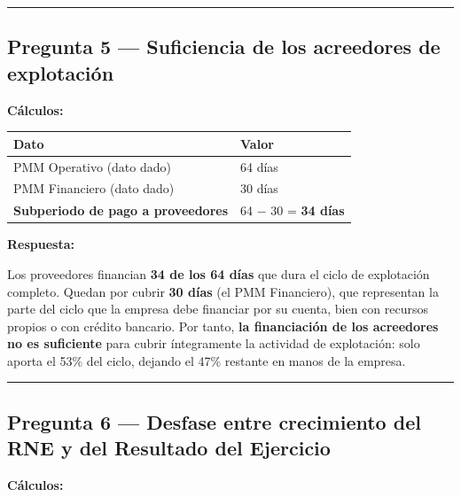 \documentclass[12pt]{book} %
\begin{document}
\begin{center}\rule{0.5\linewidth}{0.5pt}\end{center}

\hypertarget{pregunta-5-suficiencia-de-los-acreedores-de-explotaciuxf3n}{%
\subsection{Pregunta 5 --- Suficiencia de los acreedores de
explotación}\label{pregunta-5-suficiencia-de-los-acreedores-de-explotaciuxf3n}}

\textbf{Cálculos:}

\begin{longtable}[]{@{}ll@{}}
\toprule\noalign{}
Dato & Valor \\
\midrule\noalign{}
\endhead
\bottomrule\noalign{}
\endlastfoot
PMM Operativo (dato dado) & 64 días \\
PMM Financiero (dato dado) & 30 días \\
\textbf{Subperiodo de pago a proveedores} & 64 − 30 = \textbf{34
días} \\
\end{longtable}

\textbf{Respuesta:}

Los proveedores financian \textbf{34 de los 64 días} que dura el ciclo
de explotación completo. Quedan por cubrir \textbf{30 días} (el PMM
Financiero), que representan la parte del ciclo que la empresa debe
financiar por su cuenta, bien con recursos propios o con crédito
bancario. Por tanto, \textbf{la financiación de los acreedores no es
suficiente} para cubrir íntegramente la actividad de explotación: solo
aporta el 53\% del ciclo, dejando el 47\% restante en manos de la
empresa.

\begin{center}\rule{0.5\linewidth}{0.5pt}\end{center}

\hypertarget{pregunta-6-desfase-entre-crecimiento-del-rne-y-del-resultado-del-ejercicio}{%
\subsection{Pregunta 6 --- Desfase entre crecimiento del RNE y del
Resultado del
Ejercicio}\label{pregunta-6-desfase-entre-crecimiento-del-rne-y-del-resultado-del-ejercicio}}

\textbf{Cálculos:}
\end{document}
